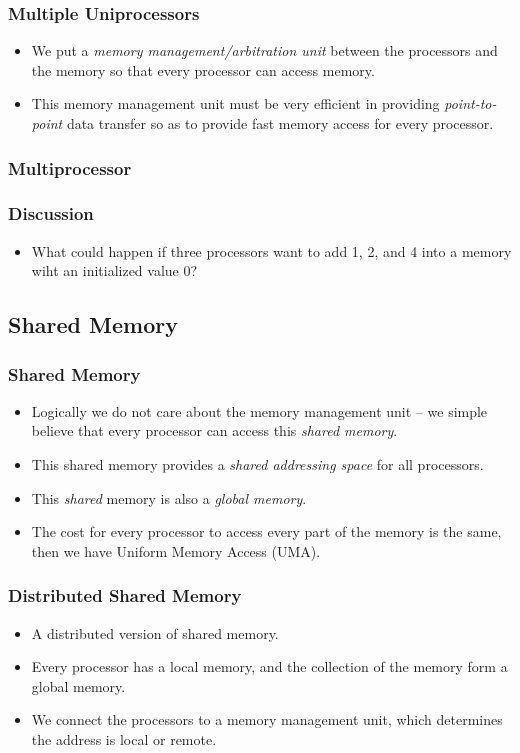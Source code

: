 \documentclass{beamer}
\begin{document}
\begin{CJK}{UTF8}{bsmi}
\begin{frame}
\frametitle{Multiple Uniprocessors}
\begin{itemize}
\item We put a {\em memory management/arbitration unit} between the
  processors and the memory so that every processor can access memory.
\item This memory management unit must be very efficient in providing
  {\em point-to-point} data transfer so as to provide fast memory
  access for every processor.
\end{itemize}
\end{frame}

\begin{frame}
\frametitle{Multiprocessor}
\centerline{}
\end{frame}

\begin{frame}
\frametitle{Discussion}
\begin{itemize}
\item What could happen if three processors want to add 1, 2, and 4
  into a memory wiht an initialized value 0?
\end{itemize}
\end{frame}

\subsection{Shared Memory}

\begin{frame}
\frametitle{Shared Memory}
\begin{itemize}
\item Logically we do not care about the memory management unit -- we
  simple believe that every processor can access this {\em shared
    memory}.
\item This shared memory provides a {\em shared addressing space} for
  all processors.
\item This {\em shared} memory is also a {\em global memory}.
\item The cost for every processor to access every part of the memory
  is the same, then we have Uniform Memory Access (UMA).
\end{itemize}
\end{frame}

\begin{frame}
\frametitle{Distributed Shared Memory}
\begin{itemize}
\item A distributed version of shared memory.
\item Every processor has a local memory, and the collection of the
  memory form a global memory.
\item We connect the processors to a memory management unit, which
  determines the address is local or remote.
\end{itemize}
\end{frame}


\end{CJK}
\end{document}

